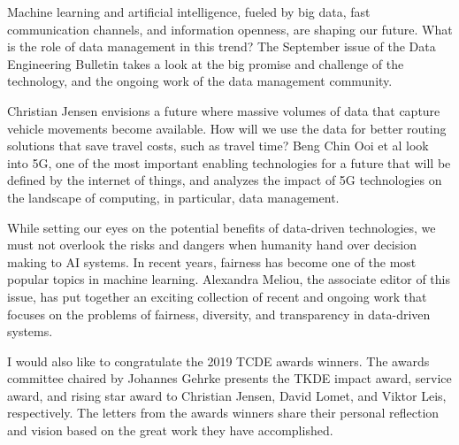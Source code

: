 \documentclass[11pt]{article}
\begin{document}
Machine learning and artificial intelligence, fueled by big data, fast
communication channels, and information openness, are shaping our
future. What is the role of data management in this trend?  The
September issue of the Data Engineering Bulletin takes a look at the
big promise and challenge of the technology, and the ongoing work of
the data management community.

Christian Jensen envisions a future where massive volumes of data that
capture vehicle movements become available. How will we use the data
for better routing solutions that save travel costs, such as travel
time?  Beng Chin Ooi et al look into 5G, one of the most important
enabling technologies for a future that will be defined by the
internet of things, and analyzes the impact of 5G technologies on the
landscape of computing, in particular, data management.

While setting our eyes on the potential benefits of data-driven
technologies, we must not overlook the risks and dangers when humanity
hand over decision making to AI systems. In recent years, fairness has
become one of the most popular topics in machine learning. Alexandra
Meliou, the associate editor of this issue, has put together an exciting
collection of recent and ongoing work that focuses on the problems of
fairness, diversity, and transparency in data-driven systems.

I would also like to congratulate the 2019 TCDE awards winners. The
awards committee chaired by Johannes Gehrke presents the TKDE impact
award, service award, and rising star award to Christian Jensen, David
Lomet, and Viktor Leis, respectively. The letters from the awards
winners share their personal reflection and vision based on the great
work they have accomplished.
\end{document}
